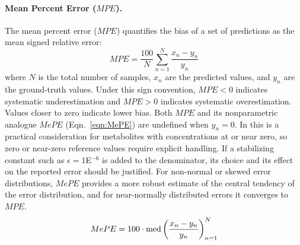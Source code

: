 \paragraph{Mean Percent Error ($MPE$).}
The mean percent error ($MPE$) quantifies the bias of a set of predictions as the mean signed relative error:%
\begin{equation}\label{eqn:MPE}
    MPE = \frac{100}{N}\sum_{n=1}^N \frac{x_n-y_n}{y_n}
\end{equation}
\noindent where $N$ is the total number of samples, $x_n$ are the predicted values, and $y_n$ are the ground-truth values. Under this sign convention, $MPE < 0$ indicates systematic underestimation and $MPE > 0$ indicates systematic overestimation. Values closer to zero indicate lower bias. Both $MPE$ and its nonparametric analogue $MePE$ (Eqn.~\ref{eqn:MePE}) are undefined when $y_n = 0$. In \MRS this is a practical consideration for metabolites with concentrations at or near zero, so zero or near-zero reference values require explicit handling. If a stabilizing constant such as $\epsilon=1$\textsc{E}$^{-6}$ is added to the denominator, its choice and its effect on the reported error should be justified. For non-normal or skewed error distributions, $MePE$ provides a more robust estimate of the central tendency of the error distribution, and for near-normally distributed errors it converges to $MPE$.
\begin{equation}\label{eqn:MePE}
    MePE = 100 \cdot \textnormal{med}\left( \frac{x_n - y_n}{y_n} \right)_{n=1}^N
\end{equation}

